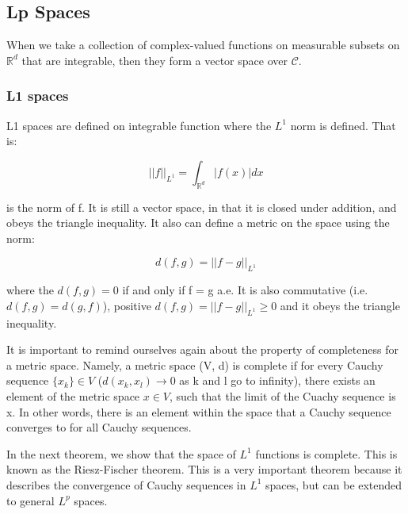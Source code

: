 \documentclass[class=article, crop=false]{standalone}
\begin{document}
	\subsection{Lp Spaces}
		When we take a collection of complex-valued functions on measurable subsets on $\mathbb{R}^d$ that are integrable, then they form a vector space over $\mathcal{C}$.

		\subsubsection{L1 spaces}
			L1 spaces are defined on integrable function where the $L^1$ norm is defined. That is:

				$$||f||_{L^1} = \int_{\mathbb{R}^d} |f(x)| dx$$

			is the norm of f. It is still a vector space, in that it is closed under addition, and obeys the triangle inequality. It also can define a metric on the space using the norm:

				$$d(f, g) = ||f - g||_{L^1}$$

			where the $d(f, g) = 0$ if and only if f = g a.e. It is also commutative (i.e. $d(f, g) = d(g, f)$), positive $d(f, g) = ||f - g||_{L^1} \ge 0$ and it obeys the triangle inequality.

			It is important to remind ourselves again about the property of completeness for a metric space. Namely, a metric space (V, d) is complete if for every Cauchy sequence $\{x_k\} \in V$ ($d(x_k, x_l) \rightarrow 0$ as k and l go to infinity), there exists an element of the metric space $x \in V$, such that the limit of the Cuachy sequence is x. In other words, there is an element within the space that a Cauchy sequence converges to for all Cauchy sequences.

			In the next theorem, we show that the space of $L^1$ functions is complete. This is known as the Riesz-Fischer theorem. This is a very important theorem because it describes the convergence of Cauchy sequences in $L^1$ spaces, but can be extended to general $L^p$ spaces.
\end{document}
